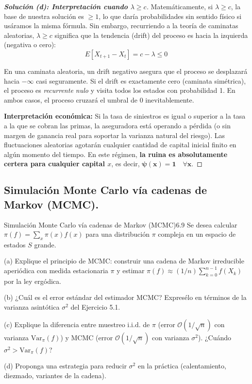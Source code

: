\documentclass[10pt,a4paper]{article}
\begin{document}
\vspace{5mm}

\begin{proof}[\textbf{Solución (d): Interpretación cuando $\lambda \ge c$}]
    Matemáticamente, si $\lambda \ge c$, la base de nuestra solución es $\ge 1$, lo que daría probabilidades sin sentido físico si usáramos la misma fórmula. Sin embargo, recurriendo a la teoría de caminatas aleatorias, $\lambda \ge c$ significa que la tendencia (drift) del proceso es hacia la izquierda (negativa o cero):
    \[ E[X_{t+1} - X_t] = c - \lambda \le 0 \]
    
    En una caminata aleatoria, un drift negativo asegura que el proceso se desplazará hacia $-\infty$ casi seguramente. Si el drift es exactamente cero (caminata simétrica), el proceso es \textit{recurrente nulo} y visita todos los estados con probabilidad 1. En ambos casos, el proceso cruzará el umbral de $0$ inevitablemente.
    
    \textbf{Interpretación económica:} Si la tasa de siniestros es igual o superior a la tasa a la que se cobran las primas, la aseguradora está operando a pérdida (o sin margen de ganancia real para soportar la varianza natural del riesgo). Las fluctuaciones aleatorias agotarán cualquier cantidad de capital inicial finito en algún momento del tiempo. En este régimen, \textbf{la ruina es absolutamente certera para cualquier capital $x$}, es decir, $\mathbf{\psi(x) = 1 \quad \forall x}$.
\end{proof}


\newpage

\subsection{Simulación Monte Carlo vía cadenas de Markov (MCMC).}



\begin{ejercicio}{Simulación Monte Carlo vía cadenas de Markov (MCMC)}{6.9}
    Se desea calcular $\pi(f) = \sum_x \pi(x)f(x)$ para una distribución $\pi$ compleja en un espacio de estados $S$ grande.
    
    (a) Explique el principio de MCMC: construir una cadena de Markov irreducible aperiódica con medida estacionaria $\pi$ y estimar $\pi(f) \approx (1/n) \sum_{k=0}^{n-1} f(X_k)$ por la ley ergódica.
    
    (b) ¿Cuál es el error estándar del estimador MCMC? Expresélo en términos de la varianza asintótica $\sigma^2$ del Ejercicio 5.1.
    
    (c) Explique la diferencia entre muestreo i.i.d. de $\pi$ (error $\mathcal{O}(1/\sqrt{n})$ con varianza $\text{Var}_\pi(f)$) y MCMC (error $\mathcal{O}(1/\sqrt{n})$ con varianza $\sigma^2$). ¿Cuándo $\sigma^2 > \text{Var}_\pi(f)$?
    
    (d) Proponga una estrategia para reducir $\sigma^2$ en la práctica (calentamiento, diezmado, variantes de la cadena).
\end{ejercicio}
\end{document}
